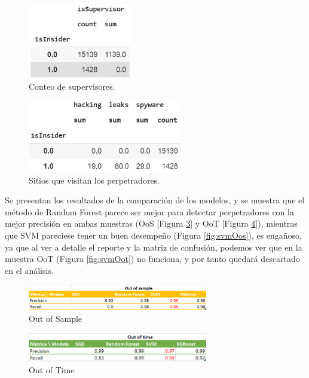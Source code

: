 \documentclass[runningheads]{llncs}
\begin{document}
\begin{figure}
    \centering
    \includegraphics[width = 0.4\textwidth]{imagenes/isSupervisor.PNG}
    \caption{Conteo de supervisores.}
    \label{fig:supervisors}
\end{figure}

\begin{figure}
    \centering
    \includegraphics[width = 0.6\textwidth]{imagenes/InsiderSites.PNG}
    \caption{Sitios que visitan los perpetradores.}
    \label{fig:insidersites}
\end{figure}

Se presentan los resultados de la comparación de los modelos, y se muestra que el método de Random Forest parece ser mejor para detectar perpetradores con la mejor precisión en ambas muestras (OoS [Figura \ref{fig:oos}]  y OoT [Figura \ref{fig:oot}]), mientras que SVM pareciese tener un buen desempeño (Figura \ref{fig:svmOos}), es engañoso, ya que al ver a detalle el reporte y la matriz de confusión, podemos ver que en la muestra OoT (Figura \ref{fig:svmOot}) no funciona, y por tanto quedará descartado en el análisis. 

\begin{figure}
    \centering
    \includegraphics[width = 0.7\textwidth]{imagenes/Out_of_Sample.png}
    \caption{Out of Sample}
    \label{fig:oos}
\end{figure}

\begin{figure}
    \centering
    \includegraphics[width = 0.7\textwidth]{imagenes/Out_of_time.png}
    \caption{Out of Time}
    \label{fig:oot}
\end{figure}
\end{document}
